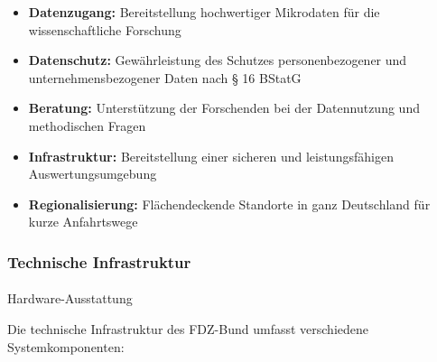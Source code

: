 \documentclass[
  ngerman,
  10pt,
  twocolumn]{article}
\makeatletter
\let\oldparagraph\paragraph
\renewcommand{\paragraph}{
    \@ifstar
      \xxxParagraphStar
      \xxxParagraphNoStar
  }
\newcommand{\xxxParagraphStar}[1]{\oldparagraph*{#1}\mbox{}}
\newcommand{\xxxParagraphNoStar}[1]{\oldparagraph{#1}\mbox{}}
\providecommand{\tightlist}{%
  \setlength{\itemsep}{0pt}\setlength{\parskip}{0pt}}
\let\origtable\table
\let\endorigtable\endtable
\renewenvironment{table}[1][htbp]{%
  \origtable*[#1]%
}{%
  \endorigtable*%
}
\makeatother
\begin{document}
\begin{itemize}
\tightlist
\item
  \textbf{Datenzugang:} Bereitstellung hochwertiger Mikrodaten für die
  wissenschaftliche Forschung
\item
  \textbf{Datenschutz:} Gewährleistung des Schutzes personenbezogener
  und unternehmensbezogener Daten nach § 16 BStatG
\item
  \textbf{Beratung:} Unterstützung der Forschenden bei der Datennutzung
  und methodischen Fragen
\item
  \textbf{Infrastruktur:} Bereitstellung einer sicheren und
  leistungsfähigen Auswertungsumgebung
\item
  \textbf{Regionalisierung:} Flächendeckende Standorte in ganz
  Deutschland für kurze Anfahrtswege
\end{itemize}

\subsubsection{Technische Infrastruktur}\label{technische-infrastruktur}

\paragraph{Hardware-Ausstattung}\label{hardware-ausstattung}

Die technische Infrastruktur des FDZ-Bund umfasst verschiedene
Systemkomponenten:

\begin{table}

\caption{\label{tbl-fdz-infrastructure}Technische Ausstattung des
FDZ-Bund (beispielhafte Konfiguration)}


\end{table}%
\end{document}
